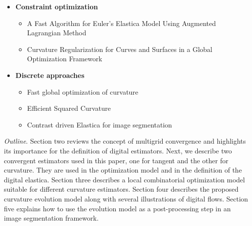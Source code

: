 \documentclass[runningheads]{llncs}
\begin{document}
\begin{itemize}
  
\item{\textbf{Constraint optimization}}
  \begin{itemize}
  \item{A Fast Algorithm for Euler's Elastica Model Using Augmented Lagrangian Method \cite{tai11elastica} }		
  \item{Curvature Regularization for Curves and Surfaces in a Global Optimization Framework \cite{strandmark11globalframework} }
  \end{itemize}
  
\item{\textbf{Discrete approaches}}
  \begin{itemize}
  \item{Fast global optimization of curvature \cite{zehiry10fast}	}
  \item{Efficient Squared Curvature \cite{nieuwenhuis14efficient} 	}
  \item{Contrast driven {E}lastica for image segmentation \cite{el2016contrast} }	
  \end{itemize}
  
	
\end{itemize}


\textit{Outline}. Section two reviews the concept of multigrid
convergence and highlights its importance for the definition of
digital estimators. Next, we describe two convergent estimators used
in this paper, one for tangent and the other for curvature. They are
used in the optimization model and in the definition of the digital
elastica. Section three describes a local combinatorial optimization model
suitable for different curvature estimators. Section four describes the proposed 
curvature evolution model along with several illustrations of digital flows. Section five
explains how to use the evolution model as a post-processing step in
an image segmentation framework. 
\end{document}
